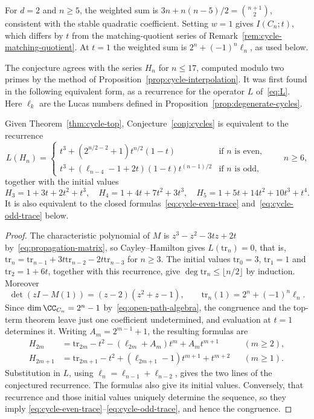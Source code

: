 For $d=2$ and $n\ge5$, the weighted sum is
$3n+n(n-5)/2=\binom{n+1}{2}$, consistent with the stable quadratic
coefficient. Setting $w=1$ gives $I(C_n;t)$, which differs by $t$ from
the matching-quotient series of Remark~\ref{rem:cycle-matching-quotient}.
At $t=1$ the weighted sum is $2^n+(-1)^n\ell_n$, as used below.

The conjecture agrees with the series $H_n$ for $n\le17$, computed
modulo two primes \cite[\texttt{cycles/}]{Cert} by the method of
Proposition~\ref{prop:cycle-interpolation}.
It was first found in the following equivalent form, as a recurrence for
the operator $L$ of~\eqref{eq:L}. Here $\ell_k$ are the Lucas numbers
defined in Proposition~\ref{prop:degenerate-cycles}.

\begin{proposition}
\label{prop:cycle-reduction}
Given Theorem~\ref{thm:cycle-top}, Conjecture~\ref{conj:cycles} is
equivalent to the recurrence
\begin{equation}
    \label{eq:circ-rec}
    L(H_n)=\begin{cases}
      t^3+ (2^{n/2-2}+1)t^{n/2}(1-t) & \text{if $n$ is even},   \\
      t^3+ (\ell_{n-4}-1+2t)(1-t)t^{(n-1)/2} & \text{if $n$ is odd,}
    \end{cases}
    \qquad n\ge6,
\end{equation}
together with the initial values
\[
H_3=1+3t+2t^2+t^3, \quad
H_4=1+4t+7t^2+3t^3,  \quad
H_5=1+5t+14t^2+10t^3+t^4.
\]
It is also equivalent to the closed formulas~\eqref{eq:cycle-even-trace}
and~\eqref{eq:cycle-odd-trace} below.
\end{proposition}
\begin{proof}
The characteristic polynomial of $M$ is
$z^3-z^2-3tz+2t$ by~\eqref{eq:propagation-matrix}, so Cayley--Hamilton
gives $L(\mathrm{tr}_n)=0$, that is, $\mathrm{tr}_n=\mathrm{tr}_{n-1}+3t\mathrm{tr}_{n-2}-2t\mathrm{tr}_{n-3}$ for $n\ge3$.
The initial values $\mathrm{tr}_0=3$, $\mathrm{tr}_1=1$ and
$\mathrm{tr}_2=1+6t$, together with this recurrence, give
$\deg\mathrm{tr}_n\le\lfloor n/2\rfloor$ by induction. Moreover
\[
\det(zI-M(1))=(z-2)(z^2+z-1),\qquad
\mathrm{tr}_n(1)=2^n+(-1)^n\ell_n.
\]
Since $\dim\CC_{C_n}=2^n-1$ by~\eqref{eq:open-path-algebra},
the congruence and the top-term theorem leave just one coefficient
undetermined, and evaluation at $t=1$ determines it.
Writing $A_m=2^{m-1}+1$, the resulting formulas are
\begin{align}
H_{2m}&=\mathrm{tr}_{2m}-t^2-(\ell_{2m}+A_m)t^m+A_mt^{m+1}
 &&(m\ge2),\label{eq:cycle-even-trace}\\
H_{2m+1}&=\mathrm{tr}_{2m+1}-t^2+(\ell_{2m+1}-1)t^{m+1}+t^{m+2}
 &&(m\ge1).\label{eq:cycle-odd-trace}
\end{align}
Substitution in $L$, using $\ell_n=\ell_{n-1}+\ell_{n-2}$,
gives the two lines of the conjectured recurrence. The formulas also give
its initial values. Conversely, that recurrence and those initial values
uniquely determine the sequence, so they imply
\eqref{eq:cycle-even-trace}--\eqref{eq:cycle-odd-trace}, and hence the
congruence.
\end{proof}

